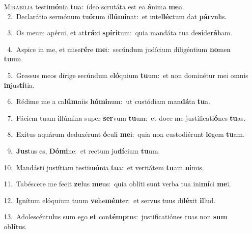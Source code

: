 \lettrine{\initial\textcolor{\initialcolor}{M}}{irabília} testi\-\textbf{mó}\-nia \textbf{tu}\-a:~\star ídeo scrutáta est ea \textbf{á}\-nima \textbf{me}\-a.\\
{\numbfont\textcolor{\numbcolor}{~2.}}~Declarátio sermónum tu\-\textbf{ó}\-rum il\-\textbf{lú}\-\textbf{mi}nat:~\star et intel\-\textbf{léc}\-tum dat \textbf{pár}\-vulis.\par
{\numbfont\textcolor{\numbcolor}{~3.}}~Os meum apérui, et at\-\textbf{trá}\-xi \textbf{spí}\-\textbf{ri}tum:~\star quia mandáta tua de\-\textbf{si}\-de\-\textbf{rá}\-bam.\par
{\numbfont\textcolor{\numbcolor}{~4.}}~Aspice in me, et mise\-\textbf{ré}\-re \textbf{me}\-i:~\star secúndum judícium diligéntium \textbf{no}\-men \textbf{tu}\-um.\par
{\numbfont\textcolor{\numbcolor}{~5.}}~Gressus meos dírige secúndum e\-\textbf{ló}\-quium \textbf{tu}\-um:~\star et non dominétur mei omnis \textbf{in}\-jus\-\textbf{tí}\-tia.\par
{\numbfont\textcolor{\numbcolor}{~6.}}~Rédime me a ca\-\textbf{lúm}\-niis \textbf{hó}\-\textbf{mi}num:~\star ut custódiam man\-\textbf{dá}\-ta \textbf{tu}\-a.\par
{\numbfont\textcolor{\numbcolor}{~7.}}~Fáciem tuam illúmina super \textbf{ser}\-vum \textbf{tu}\-um:~\star et doce me justificati\-\textbf{ó}\-nes \textbf{tu}\-as.\par
{\numbfont\textcolor{\numbcolor}{~8.}}~Exitus aquárum deduxérunt \textbf{ó}\-culi \textbf{me}\-i:~\star quia non custodiérunt \textbf{le}\-gem \textbf{tu}\-am.\par
{\numbfont\textcolor{\numbcolor}{~9.}}~\-\textbf{Jus}\-tus es, \textbf{Dó}\-\textbf{mi}ne:~\star et rectum ju\-\textbf{dí}\-cium \textbf{tu}\-um.\par
{\numbfont\textcolor{\numbcolor}{10.}}~Mandásti justítiam testi\-\textbf{mó}\-nia \textbf{tu}\-a:~\star et veritátem \textbf{tu}\-am \textbf{ni}\-mis.\par
{\numbfont\textcolor{\numbcolor}{11.}}~Tabéscere me fecit \textbf{ze}\-lus \textbf{me}\-us:~\star quia oblíti sunt verba tua ini\-\textbf{mí}\-ci \textbf{me}\-i.\par
{\numbfont\textcolor{\numbcolor}{12.}}~Ignítum elóquium tuum \textbf{ve}\-he\-\textbf{mén}\-ter:~\star et servus tuus di\-\textbf{lé}\-xit \textbf{il}\-lud.\par
{\numbfont\textcolor{\numbcolor}{13.}}~Adolescéntulus sum ego \textbf{et} con\-\textbf{témp}\-tus:~\star justificatiónes tuas non \textbf{sum} ob\-\textbf{lí}\-tus.\par
